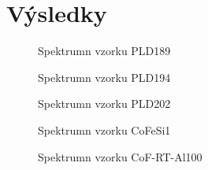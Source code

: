 \chapter{Výsledky}

\begin{figure}

\caption{Spektrumn vzorku PLD189}
\label{sPLD189}
\end{figure}

\begin{figure}

\caption{Spektrumn vzorku PLD194}
\label{sPLD194}
\end{figure}

\begin{figure}

\caption{Spektrumn vzorku PLD202}
\label{sPLD202}
\end{figure}

\begin{figure}

\caption{Spektrumn vzorku CoFeSi1}
\label{sCoFeSi1}
\end{figure}

\begin{figure}

\caption{Spektrumn vzorku CoF-RT-Al100}
\label{sCoF-RT-Al100}
\end{figure}
